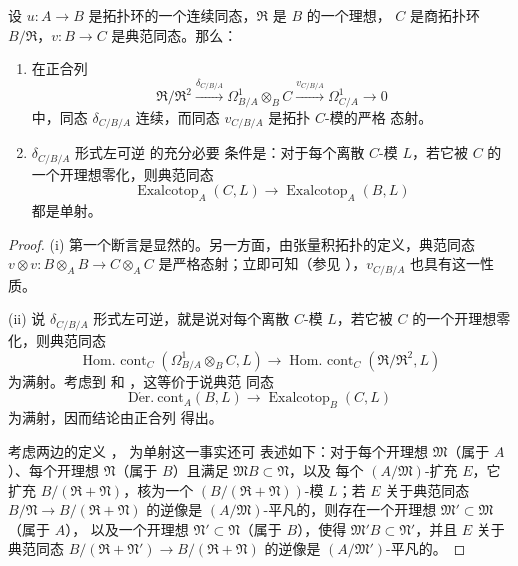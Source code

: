 \begin{proposition}[20.7.8]
\label{0.20.7.8-fr}
设 $u:A\to B$ 是拓扑环的一个连续同态，$\mathfrak{R}$ 是 $B$ 的一个理想，
$C$ 是商拓扑环 $B/\mathfrak{R}$，$v:B\to C$ 是典范同态。那么：
\begin{enumerate}
  \item[\rm(i)] 在正合列 
\[
  \mathfrak{R}/\mathfrak{R}^2\xrightarrow{\delta_{C/B/A}}
  \Omega^1_{B/A}\otimes_B C\xrightarrow{v_{C/B/A}}\Omega^1_{C/A}\to0
\]
中，同态 $\delta_{C/B/A}$ 连续，而同态 $v_{C/B/A}$ 是拓扑 $C$-模的严格
态射。
  \item[\rm(ii)] $\delta_{C/B/A}$ 形式左可逆  的充分必要
条件是：对于每个离散 $C$-模 $L$，若它被 $C$ 的一个开理想零化，则典范同态
\begin{equation}
\tag{20.7.8.1}
\label{0.20.7.8.1-fr}
  \operatorname{Exalcotop}_A(C,L)\to\operatorname{Exalcotop}_A(B,L)
\end{equation}
都是单射。
\end{enumerate}
\end{proposition}

\begin{proof}
(i) 第一个断言是显然的。另一方面，由张量积拓扑的定义，典范同态
$v\otimes v:B\otimes_A B\to C\otimes_A C$ 是严格态射；立即可知（参见
），$v_{C/B/A}$ 也具有这一性质。

(ii) 说 $\delta_{C/B/A}$ 形式左可逆，就是说对每个离散 $C$-模 $L$，若它被
$C$ 的一个开理想零化，则典范同态
\[
  \operatorname{Hom.\ cont}_C(\Omega^1_{B/A}\otimes_B C,L)\to
  \operatorname{Hom.\ cont}_C(\mathfrak{R}/\mathfrak{R}^2,L)
\]
为满射。考虑到  和 ，这等价于说典范
同态
\[
  \operatorname{D\acute{e}r.\ cont}_A(B,L)\to
  \operatorname{Exalcotop}_B(C,L)
\]
为满射，因而结论由正合列  得出。

考虑两边的定义 ， 为单射这一事实还可
表述如下：对于每个开理想 $\mathfrak{M}$（属于 $A$）、每个开理想
$\mathfrak{N}$（属于 $B$）且满足 $\mathfrak{M}B\subset\mathfrak{N}$，以及
每个 $(A/\mathfrak{M})$-扩充 $E$，它扩充
$B/(\mathfrak{R}+\mathfrak{N})$，核为一个
$(B/(\mathfrak{R}+\mathfrak{N}))$-模 $L$；若 $E$ 关于典范同态
$B/\mathfrak{N}\to B/(\mathfrak{R}+\mathfrak{N})$ 的逆像是
$(A/\mathfrak{M})$-平凡的，则存在一个开理想
$\mathfrak{M}'\subset\mathfrak{M}$（属于 $A$），
以及一个开理想 $\mathfrak{N}'\subset\mathfrak{N}$（属于 $B$），使得
$\mathfrak{M}'B\subset\mathfrak{N}'$，并且 $E$ 关于典范同态
$B/(\mathfrak{R}+\mathfrak{N}')\to B/(\mathfrak{R}+\mathfrak{N})$ 的逆像是
$(A/\mathfrak{M}')$-平凡的。
\end{proof}

